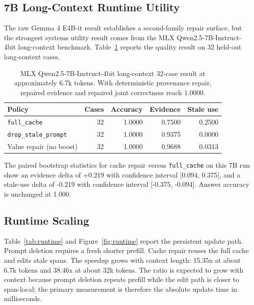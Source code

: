 \documentclass[11pt]{article}
\newcommand{\fullcache}{\texttt{full\_cache}}
\newcommand{\promptdelete}{\texttt{drop\_stale\_prompt}}
\newcommand{\gemma}{Gemma 4 E4B-it}
\newcommand{\qwen}{Qwen2.5-7B-Instruct-4bit}
\begin{document}
\subsection{7B Long-Context Runtime Utility}

The raw \gemma{} result establishes a second-family repair surface, but the
strongest systems utility result comes from the MLX \qwen{} long-context
benchmark. Table~\ref{tab:mlx7b} reports the quality result on 32 held-out
long-context cases.

\begin{table}[H]
\centering
\small
\begin{tabular}{lrrrr}
\toprule
\textbf{Policy} & \textbf{Cases} & \textbf{Accuracy} & \textbf{Evidence} & \textbf{Stale use} \\
\midrule
\fullcache & 32 & 1.0000 & 0.7500 & 0.2500 \\
\promptdelete & 32 & 1.0000 & 0.9375 & 0.0000 \\
Value repair (no boost) & 32 & 1.0000 & 0.9688 & 0.0313 \\
\bottomrule
\end{tabular}
\caption{MLX \qwen{} long-context 32-case result at approximately 6.7k
tokens. With deterministic provenance repair, repaired evidence and repaired
joint correctness reach 1.0000.}
\label{tab:mlx7b}
\end{table}

The paired bootstrap statistics for cache repair versus \fullcache{} on this
7B run show an evidence delta of +0.219 with confidence interval
[0.094, 0.375], and a stale-use delta of -0.219 with confidence interval
[-0.375, -0.094]. Answer accuracy is unchanged at 1.000.

\subsection{Runtime Scaling}

Table~\ref{tab:runtime} and Figure~\ref{fig:runtime} report the persistent
update path. Prompt deletion requires a fresh shorter prefill. Cache repair
reuses the full cache and edits stale spans. The speedup grows with context
length: 15.35x at about 6.7k tokens and 38.46x at about 32k tokens. The ratio
is expected to grow with context because prompt deletion repeats prefill while
the edit path is closer to span-local; the primary measurement is therefore the
absolute update time in milliseconds.
\end{document}
